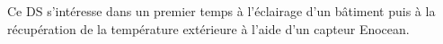 \documentclass[ds]{UPSTI_Document}
\begin{document}
Ce DS s'intéresse dans un premier temps à l'éclairage d'un bâtiment puis à la récupération de la température extérieure à l'aide d'un capteur Enocean.

    
    
    \pagebreak
    \FloatBarrier
    
    \appendix
    
\end{document}
